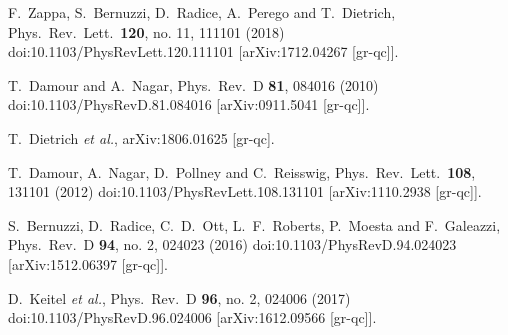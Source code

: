 \documentclass[aps,prl,onecolumn,superscriptaddress,groupedaddress,nofootinbib,floatfix,notitlepage]{revtex4-1}
\begin{document}
\begin{thebibliography}{1}

  F.~Zappa, S.~Bernuzzi, D.~Radice, A.~Perego and T.~Dietrich,
  Phys.\ Rev.\ Lett.\  {\bf 120}, no. 11, 111101 (2018)
  doi:10.1103/PhysRevLett.120.111101
  [arXiv:1712.04267 [gr-qc]].

  T.~Damour and A.~Nagar,
  Phys.\ Rev.\ D {\bf 81}, 084016 (2010)
  doi:10.1103/PhysRevD.81.084016
  [arXiv:0911.5041 [gr-qc]].

  T.~Dietrich {\it et al.},
  arXiv:1806.01625 [gr-qc].

  T.~Damour, A.~Nagar, D.~Pollney and C.~Reisswig,
  Phys.\ Rev.\ Lett.\  {\bf 108}, 131101 (2012)
  doi:10.1103/PhysRevLett.108.131101
  [arXiv:1110.2938 [gr-qc]].

  S.~Bernuzzi, D.~Radice, C.~D.~Ott, L.~F.~Roberts, P.~Moesta and F.~Galeazzi,
  Phys.\ Rev.\ D {\bf 94}, no. 2, 024023 (2016)
  doi:10.1103/PhysRevD.94.024023
  [arXiv:1512.06397 [gr-qc]].

  D.~Keitel {\it et al.},
  Phys.\ Rev.\ D {\bf 96}, no. 2, 024006 (2017)
  doi:10.1103/PhysRevD.96.024006
  [arXiv:1612.09566 [gr-qc]].


\end{thebibliography}
\end{document}

